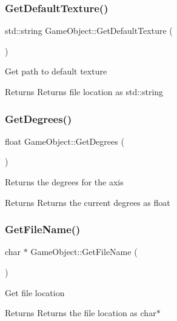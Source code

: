 \subsubsection{\texorpdfstring{GetDefaultTexture()}{GetDefaultTexture()}}
{\footnotesize\ttfamily std\+::string Game\+Object\+::\+Get\+Default\+Texture (\begin{DoxyParamCaption}{ }\end{DoxyParamCaption})}

Get path to default texture \begin{DoxyReturn}{Returns}
Returns file location as std\+::string 
\end{DoxyReturn}
\mbox{\label{class_game_object_a5c21a0d0cbc3a071b76aeefe814aa589}} 
\subsubsection{\texorpdfstring{GetDegrees()}{GetDegrees()}}
{\footnotesize\ttfamily float Game\+Object\+::\+Get\+Degrees (\begin{DoxyParamCaption}{ }\end{DoxyParamCaption})}

Returns the degrees for the axis \begin{DoxyReturn}{Returns}
Returns the current degrees as float 
\end{DoxyReturn}
\mbox{\label{class_game_object_a5e449ed9a13ab543b02aca997ba475d9}} 
\subsubsection{\texorpdfstring{GetFileName()}{GetFileName()}}
{\footnotesize\ttfamily char $\ast$ Game\+Object\+::\+Get\+File\+Name (\begin{DoxyParamCaption}{ }\end{DoxyParamCaption})}

Get file location \begin{DoxyReturn}{Returns}
Returns the file location as char$\ast$ 
\end{DoxyReturn}
\mbox{\label{class_game_object_a64538a684f696603ee20d1a02cabce9f}} 
